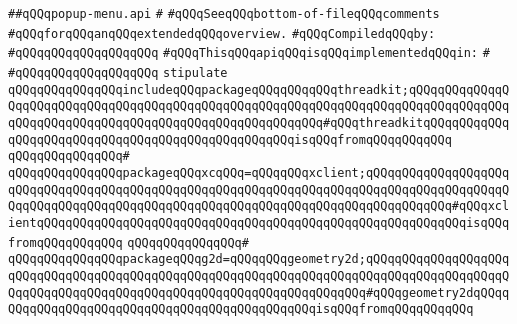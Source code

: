 \label{src/lib/x-kit/widget/old/menu/popup-menu.api}
\verb|##qQQqpopup-menu.api|\newline
\verb|#|\newline
\verb|#qQQqSeeqQQqbottom-of-fileqQQqcomments|\newline
\verb|#qQQqforqQQqanqQQqextendedqQQqoverview.|\newline
\newline
\verb|#qQQqCompiledqQQqby:|\newline
\verb|#qQQqqQQqqQQqqQQqqQQq|\newline
\newline
\verb|#qQQqThisqQQqapiqQQqisqQQqimplementedqQQqin:|\newline
\verb|#|\newline
\verb|#qQQqqQQqqQQqqQQqqQQq|\newline
\newline
\verb|stipulate|\newline
\verb|qQQqqQQqqQQqqQQqincludeqQQqpackageqQQqqQQqqQQqthreadkit;qQQqqQQqqQQqqQQqqQQqqQQqqQQqqQQqqQQqqQQqqQQqqQQqqQQqqQQqqQQqqQQqqQQqqQQqqQQqqQQqqQQqqQQqqQQqqQQqqQQqqQQqqQQqqQQqqQQqqQQqqQQqqQQq#qQQqthreadkitqQQqqQQqqQQqqQQqqQQqqQQqqQQqqQQqqQQqqQQqqQQqqQQqqQQqisqQQqfromqQQqqQQqqQQq|\newline
\verb|qQQqqQQqqQQqqQQq#|\newline
\verb|qQQqqQQqqQQqqQQqpackageqQQqxcqQQq=qQQqqQQqxclient;qQQqqQQqqQQqqQQqqQQqqQQqqQQqqQQqqQQqqQQqqQQqqQQqqQQqqQQqqQQqqQQqqQQqqQQqqQQqqQQqqQQqqQQqqQQqqQQqqQQqqQQqqQQqqQQqqQQqqQQqqQQqqQQqqQQqqQQqqQQqqQQqqQQqqQQq#qQQqxclientqQQqqQQqqQQqqQQqqQQqqQQqqQQqqQQqqQQqqQQqqQQqqQQqqQQqqQQqqQQqisqQQqfromqQQqqQQqqQQq|\newline
\verb|qQQqqQQqqQQqqQQq#|\newline
\verb|qQQqqQQqqQQqqQQqpackageqQQqg2d=qQQqqQQqgeometry2d;qQQqqQQqqQQqqQQqqQQqqQQqqQQqqQQqqQQqqQQqqQQqqQQqqQQqqQQqqQQqqQQqqQQqqQQqqQQqqQQqqQQqqQQqqQQqqQQqqQQqqQQqqQQqqQQqqQQqqQQqqQQqqQQqqQQqqQQqqQQq#qQQqgeometry2dqQQqqQQqqQQqqQQqqQQqqQQqqQQqqQQqqQQqqQQqqQQqqQQqisqQQqfromqQQqqQQqqQQq|\newline
